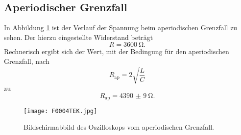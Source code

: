 \documentclass[
  bibliography=totoc,     %
  captions=tableheading,  %
  titlepage=firstiscover, %
]{scrartcl}
\begin{document}
\subsection{Aperiodischer Grenzfall}
In Abbildung \ref{fig:apgrenze} ist der Verlauf der Spannung beim aperiodischen
Grenzfall zu sehen. Der hierzu eingestellte Widerstand beträgt
\begin{equation}
  R = \SI{3600}{\ohm}.
\end{equation}
Rechnerisch ergibt sich der Wert, mit der Bedingung für den aperiodischen Grenzfall,
nach
\begin{equation}
  R_\mathup{ap} = 2 \sqrt{\frac{L}{C}}
\end{equation}
zu
\begin{equation}
  R_\mathup{ap} = \SI{4390(9)}{\ohm}.
\end{equation}
\begin{figure}[htb]
  \centering
  \texttt{[image: F0004TEK.jpg]}
  \caption{Bildschirmabbild des Oszilloskops vom aperiodischen Grenzfall.}
  \label{fig:apgrenze}
\end{figure}
\clearpage
\end{document}

